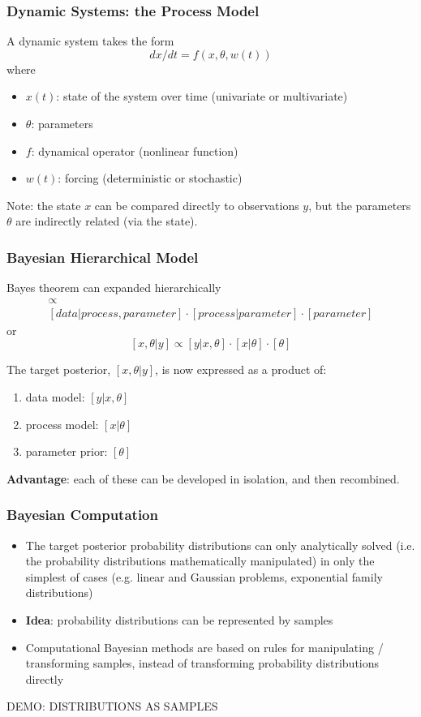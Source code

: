 \documentclass{beamer}
\renewcommand{\bf}{\bfseries}
\begin{document}

\frame%
{\frametitle{Dynamic Systems: the Process Model}
A dynamic system takes the form
\[
dx/dt = f(x,\theta,w(t))
\] 
where 
\begin{itemize}
\item
$x(t)$: state of the system over time (univariate or multivariate)
\item
$\theta$: parameters
\item
$f$: dynamical operator (nonlinear function)
\item
$w(t)$: forcing (deterministic or stochastic)
\end{itemize}

\medskip
Note:  the state $x$ can be compared directly to observations $y$, but the parameters $\theta$ are indirectly related (via the state).
}

\frame%
{\frametitle{Bayesian Hierarchical Model}

Bayes theorem can expanded hierarchically
\begin{multline*}
[process, parameter | data]  \propto  \\ [data | process, parameter] \cdot [process | parameter] \cdot [parameter]
\end{multline*}
or
\[
[x,\theta | y] \propto [y | x, \theta] \cdot [x | \theta] \cdot [\theta]
\]

\medskip
The target posterior, $[x,\theta | y]$, is now expressed as a product of: 
\begin{enumerate}
\item
data model: $[y | x, \theta]$
\item
process model:  $[x | \theta]$
\item
parameter prior:  $[\theta]$
\end{enumerate}
{\bf Advantage}: each of these can be developed in isolation, and then recombined. 
}

\frame%
{\frametitle{Bayesian Computation}

\begin{itemize}
\item
The target posterior probability distributions can only analytically solved (i.e. the probability distributions mathematically manipulated) in only the simplest of cases (e.g. linear and Gaussian problems, exponential family distributions)
\item
{\bf Idea}: probability distributions can be represented by samples 
\item
Computational Bayesian methods are based on rules for manipulating / transforming samples, instead of transforming probability distributions directly
\end{itemize}

\color{red} DEMO: DISTRIBUTIONS AS SAMPLES
}
\end{document}
